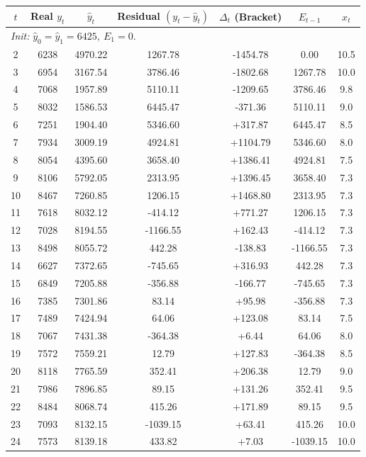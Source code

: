 \documentclass[10pt]{article}
\begin{document}
\begin{enumerate}
\label{tab:euler_corr_24}
\begin{tabular}{ccccccc}
\toprule
$t$ & Real $y_t$ & $\hat{y}_t$ & Residual $(y_t-\hat{y}_t)$ & $\Delta_t$ {\footnotesize (Bracket)} & $E_{t-1}$ & $x_t$\\
\midrule
\multicolumn{7}{l}{\textit{Init: }$\hat{y}_0=\hat{y}_1=6425,\ E_1=0.$}\\
2 &6238 &4970.22 &1267.78 &-1454.78 &0.00  &10.5\\
3 &6954 &3167.54 &3786.46 &-1802.68 &1267.78 &10.0\\
4 &7068 &1957.89 &5110.11 &-1209.65 &3786.46 &9.8\\
5 &8032 &1586.53 &6445.47 &-371.36 &5110.11 &9.0\\
6 &7251 &1904.40 &5346.60 &+317.87 &6445.47 &8.5\\
7 &7934 &3009.19 &4924.81 &+1104.79 &5346.60 &8.0\\
8 &8054 &4395.60 &3658.40 &+1386.41 &4924.81 &7.5\\
9 &8106 &5792.05 &2313.95 &+1396.45 &3658.40 &7.3\\
10&8467 &7260.85 &1206.15 &+1468.80 &2313.95 &7.3\\
11&7618 &8032.12 &-414.12 &+771.27  &1206.15 &7.3\\
12&7028 &8194.55 &-1166.55 &+162.43 &-414.12 &7.3\\
13&8498 &8055.72 &442.28 &-138.83 &-1166.55 &7.3\\
14&6627 &7372.65 &-745.65 &+316.93 &442.28  &7.3\\
15&6849 &7205.88 &-356.88 &-166.77 &-745.65 &7.3\\
16&7385 &7301.86 &83.14  &+95.98   &-356.88 &7.3\\
17&7489 &7424.94 &64.06  &+123.08  &83.14   &7.5\\
18&7067 &7431.38 &-364.38 &+6.44   &64.06   &8.0\\
19&7572 &7559.21 &12.79   &+127.83 &-364.38 &8.5\\
20&8118 &7765.59 &352.41  &+206.38 &12.79   &9.0\\
21&7986 &7896.85 &89.15   &+131.26 &352.41  &9.5\\
22&8484 &8068.74 &415.26  &+171.89 &89.15   &9.5\\
23&7093 &8132.15 &-1039.15 &+63.41 &415.26  &10.0\\
24&7573 &8139.18 &433.82  &+7.03  &-1039.15 &10.0\\
\bottomrule
\end{tabular}
\


\end{enumerate}
\end{document}
